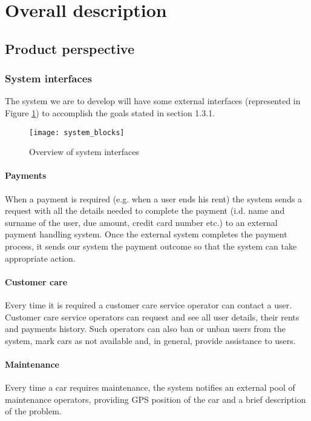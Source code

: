 \section{Overall description}
\subsection{Product perspective}
	\subsubsection{System interfaces}
	\label{sec:systemInterfaces}
		The system we are to develop will have some external interfaces (represented in Figure \ref{fig:systemInterfaces}) to accomplish the goals stated in section 1.3.1.
		\begin{figure}[h]
			\centering
			\texttt{[image: system\_blocks]}
			\caption{
				\label{fig:systemInterfaces} 
				Overview of system interfaces
			}
		\end{figure}
	\paragraph{Payments}
	When a payment is required (e.g. when a user ends his rent) the system sends a request with all the details needed to complete the payment (i.d. name and surname of the user, due amount, credit card number etc.) to an external payment handling system. Once the external system completes the payment process, it sends our system the payment outcome so that the system can take appropriate action.
	
	\paragraph{Customer care} Every time it is required a customer care service operator can contact a user. Customer care service operators can request and see all user details, their rents and payments history. Such operators can also ban or unban users from the system, mark cars as not available and, in general, provide assistance to users.

	\paragraph{Maintenance} Every time a car requires maintenance, the system notifies an external pool of maintenance operators, providing  GPS position of the car and a brief description of the problem.

